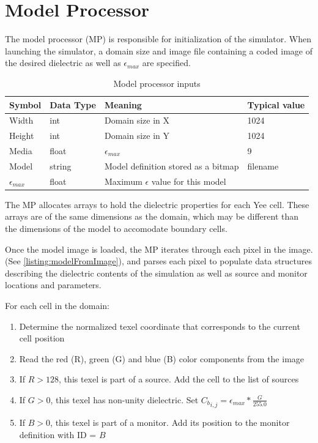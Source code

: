 \section{Model Processor}\label{sec:modelProcessor}

The model processor (MP) is responsible for initialization of the simulator. When launching the simulator, a domain size and image file containing a coded image of the desired dielectric as well as $\epsilon_{max}$ are specified.

\begin{table}[h!]
	\centering
	\caption{Model processor inputs}
	\label{tab:modelProcessorInputs}
	\begin{tabular}{l | l | l | l}
		Symbol	& Data Type & Meaning & Typical value				\\
		\hline														
		Width	& int 		& Domain size in X & 1024				\\
		Height	& int 		& Domain size in Y & 1024				\\
		Media	& float 	& $\epsilon_{max}$ & 9						\\
		Model	& string	& Model definition stored as a bitmap & filename \\
		$\epsilon_{max}$ & float & Maximum $\epsilon$ value for this model
	\end{tabular}
\end{table}

The MP allocates arrays to hold the dielectric properties for each Yee cell. These arrays are of the same dimensions as the domain, which may be different than the dimensions of the model to accomodate boundary cells.

Once the model image is loaded, the MP iterates through each pixel in the image. (See \autoref{listing:modelFromImage}), and parses each pixel to populate data structures describing the dielectric contents of the simulation as well as source and monitor locations and parameters.

For each cell in the domain:

\begin{enumerate}
	\item Determine the normalized texel coordinate that corresponds to the current cell position	
	\item Read the red (R), green (G) and blue (B) color components from the image
	\item If $R > 128$, this texel is part of a source. Add the cell to the list of sources
	\item If $G > 0$, this texel has non-unity dielectric. Set ${C_b}_{i,j} = \epsilon_{max} * \frac{G}{255.0}$
	\item If $B > 0$, this texel is part of a monitor. Add its position to the monitor definition with ID = $B$
\end{enumerate}

